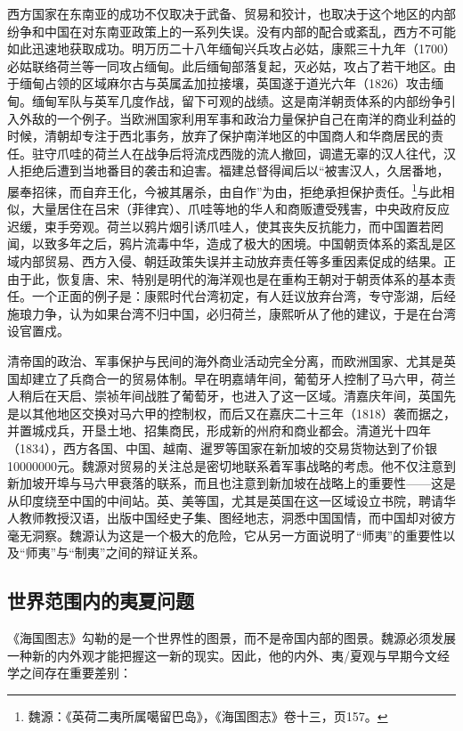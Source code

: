 \documentclass[a4paper, 12pt, openright]{ctexbook}
\begin{document}
西方国家在东南亚的成功不仅取决于武备、贸易和狡计，也取决于这个地区的内部纷争和中国在对东南亚政策上的一系列失误。没有内部的配合或紊乱，西方不可能如此迅速地获取成功。明万历二十八年缅甸兴兵攻占必姑，康熙三十九年（1700）必姑联络荷兰等一同攻占缅甸。此后缅甸部落复起，灭必姑，攻占了若干地区。由于缅甸占领的区域麻尔古与英属孟加拉接壤，英国遂于道光六年（1826）攻击缅甸。缅甸军队与英军几度作战，留下可观的战绩。这是南洋朝贡体系的内部纷争引入外敌的一个例子。当欧洲国家利用军事和政治力量保护自己在南洋的商业利益的时候，清朝却专注于西北事务，放弃了保护南洋地区的中国商人和华商居民的责任。驻守爪哇的荷兰人在战争后将流戍西陇的流人撤回，调遣无辜的汉人往代，汉人拒绝后遭到当地番目的袭击和迫害。福建总督得闻后以“被害汉人，久居番地，屡奉招徕，而自弃王化，今被其屠杀，由自作”为由，拒绝承担保护责任。\footnote{魏源：《英荷二夷所属噶留巴岛》，《海国图志》卷十三，页157。}与此相似，大量居住在吕宋（菲律宾）、爪哇等地的华人和商贩遭受残害，中央政府反应迟缓，束手旁观。荷兰以鸦片烟引诱爪哇人，使其丧失反抗能力，而中国置若罔闻，以致多年之后，鸦片流毒中华，造成了极大的困境。中国朝贡体系的紊乱是区域内部贸易、西方入侵、朝廷政策失误并主动放弃责任等多重因素促成的结果。正由于此，恢复唐、宋、特别是明代的海洋观也是在重构王朝对于朝贡体系的基本责任。一个正面的例子是：康熙时代台湾初定，有人廷议放弃台湾，专守澎湖，后经施琅力争，认为如果台湾不归中国，必归荷兰，康熙听从了他的建议，于是在台湾设官置戍。

清帝国的政治、军事保护与民间的海外商业活动完全分离，而欧洲国家、尤其是英国却建立了兵商合一的贸易体制。早在明嘉靖年间，葡萄牙人控制了马六甲，荷兰人稍后在天启、崇祯年间战胜了葡萄牙，也进入了这一区域。清嘉庆年间，英国先是以其他地区交换对马六甲的控制权，而后又在嘉庆二十三年（1818）袭而据之，并置城戍兵，开垦土地、招集商民，形成新的州府和商业都会。清道光十四年（1834），西方各国、中国、越南、暹罗等国家在新加坡的交易货物达到了价银10000000元。魏源对贸易的关注总是密切地联系着军事战略的考虑。他不仅注意到新加坡开埠与马六甲衰落的联系，而且也注意到新加坡在战略上的重要性——这是从印度绕至中国的中间站。英、美等国，尤其是英国在这一区域设立书院，聘请华人教师教授汉语，出版中国经史子集、图经地志，洞悉中国国情，而中国却对彼方毫无洞察。魏源认为这是一个极大的危险，它从另一方面说明了“师夷”的重要性以及“师夷”与“制夷”之间的辩证关系。

\subsection{世界范围内的夷夏问题}

《海国图志》勾勒的是一个世界性的图景，而不是帝国内部的图景。魏源必须发展一种新的内外观才能把握这一新的现实。因此，他的内外、夷/夏观与早期今文经学之间存在重要差别：
\end{document}
